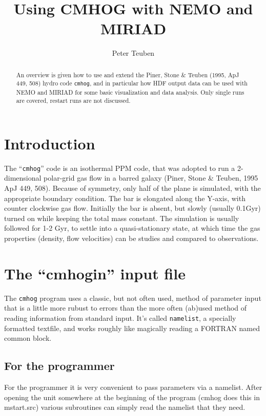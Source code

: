 \documentclass[11pt]{article}
\title{Using CMHOG with NEMO and MIRIAD}
\author{Peter Teuben}
\begin{document}
\maketitle


\begin{abstract}

An overview is given how to use and extend 
the Piner, Stone \& Teuben (1995, ApJ 449, 508) hydro code
{\tt cmhog}, and in particular how HDF output data can be used with
NEMO and MIRIAD for some basic visualization and data analysis.
Only single runs are covered, restart runs are not discussed.

\end{abstract}

\section{Introduction}

The ``{\tt cmhog}'' code is an isothermal PPM code, 
that was adopted to run a 2-dimensional polar-grid gas flow in a 
barred galaxy (Piner, Stone \& Teuben, 1995 ApJ 449, 508).
Because of symmetry, only half of the plane is
simulated, with the appropriate  boundary condition.
The bar is elongated along the Y-axis, with 
counter clockwise gas flow. Initially the bar is absent, but
slowly (usually 0.1Gyr) turned on while keeping
the total mass constant. The simulation
is usually followed for 1-2 Gyr, to settle into a quasi-stationary
state, at which time the gas properties (density, flow velocities)
can be studies and compared to observations.

\section{The ``cmhogin'' input file}

The {\tt cmhog} program uses a classic, but not often used, method of parameter input
that is a little more rubust to errors than the more often (ab)used method
of reading information from standard input. It's called {\tt namelist},
a specially formatted textfile, 
and works roughly like magically reading a FORTRAN named common block. 

\subsection{For the programmer}

For the programmer it is very convenient to pass parameters via a namelist.
After opening the unit somewhere at the beginning of the program
(cmhog does this in mstart.src) various subroutines can simply read
the namelist  that they need.
\end{document}
